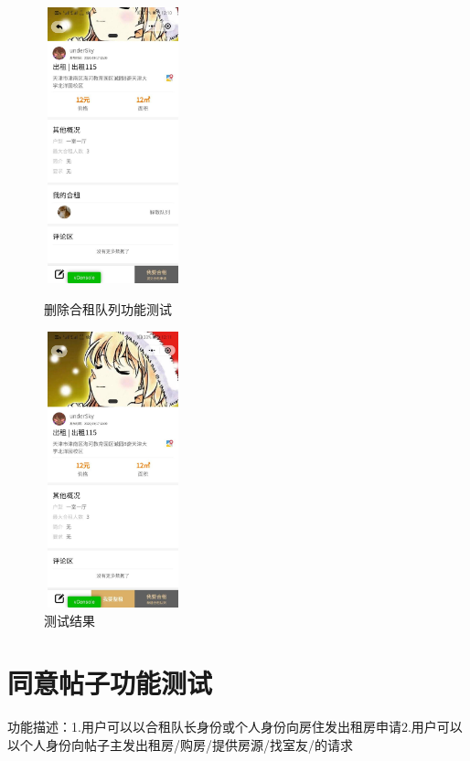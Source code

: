    \begin{figure}[htbp]
       \centering
       \begin{minipage}[t]{0.48\textwidth}
       \centering
       \includegraphics[width=4cm,height=8cm]{test/image/test42.png} 
    
      \caption{删除合租队列功能测试} 
       \end{minipage}
       \begin{minipage}[t]{0.48\textwidth}
       \centering
       \includegraphics[width=4cm,height=8cm]{test/image/test43.png}
       \caption{测试结果}
       \end{minipage}
       \end{figure}
   
   \section{同意帖子功能测试}
   功能描述：1.用户可以以合租队长身份或个人身份向房住发出租房申请2.用户可以以个人身份向帖子主发出租房/购房/提供房源/找室友/的请求
   
